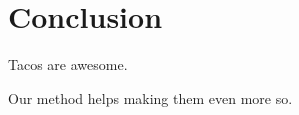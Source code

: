 
\section{Conclusion}
\label{conclusion}

Tacos are awesome.

Our method helps making them even more so.